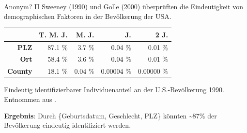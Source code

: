 \begin{frame}{Anonym? II}
	Sweeney \cite{sweeney_demographics}(1990) und Golle \cite{golle_demographics}(2000) überprüften die Eindeutigkeit von demographischen Faktoren in der Bevölkerung der USA.
	
	
	\begin{center}
		\begin{tabular}{|r|r|r|r|r|}
		\hline	 & \textbf{T. M. J.} & \textbf{M. J.} & \textbf{J.} & \textbf{2 J.} \\
		\hline \textbf{PLZ} & 87.1 \% & 3.7 \% & 0.04 \% & 0.01 \% \\
		\hline \textbf{Ort} & 58.4 \% & 3.6 \% & 0.04 \% & 0.01 \% \\
		\hline \textbf{County} & 18.1 \% & 0.04 \% & 0.00004 \% & 0.00000 \% \\
		\hline
		\end{tabular}
		\vspace{0.2cm}
	
		\tiny Eindeutig identifizierbarer Individuenanteil an der U.S.-Bevölkerung 1990. Entnommen aus \cite{sweeney_demographics}.
	\end{center}

	\textbf{Ergebnis}: Durch \{Geburtsdatum, Geschlecht, PLZ\} könnten \textasciitilde{}87\% der Bevölkerung eindeutig identifiziert werden.
		
\end{frame}

